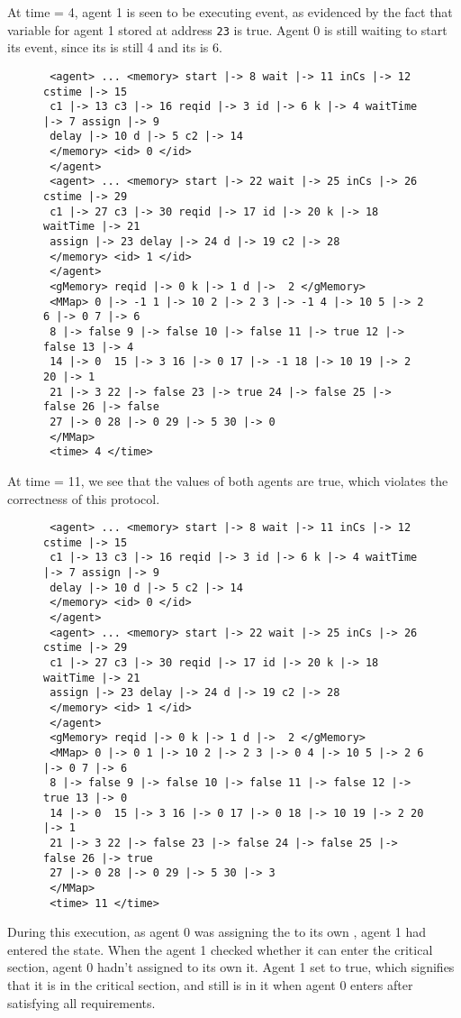 At time = 4, agent 1 is seen to be executing  event, as evidenced by the fact that variable  for agent 1 stored at address \verb|23| is true. Agent 0 is still waiting to start its  event, since its  is still 4 and its  is 6.  
 \begin{figure}[H]
\begin{verbatim}
 <agent> ... <memory> start |-> 8 wait |-> 11 inCs |-> 12 cstime |-> 15 
 c1 |-> 13 c3 |-> 16 reqid |-> 3 id |-> 6 k |-> 4 waitTime |-> 7 assign |-> 9
 delay |-> 10 d |-> 5 c2 |-> 14 
 </memory> <id> 0 </id> 
 </agent> 
 <agent> ... <memory> start |-> 22 wait |-> 25 inCs |-> 26 cstime |-> 29
 c1 |-> 27 c3 |-> 30 reqid |-> 17 id |-> 20 k |-> 18 waitTime |-> 21 
 assign |-> 23 delay |-> 24 d |-> 19 c2 |-> 28 
 </memory> <id> 1 </id> 
 </agent>
 <gMemory> reqid |-> 0 k |-> 1 d |->  2 </gMemory>
 <MMap> 0 |-> -1 1 |-> 10 2 |-> 2 3 |-> -1 4 |-> 10 5 |-> 2 6 |-> 0 7 |-> 6
 8 |-> false 9 |-> false 10 |-> false 11 |-> true 12 |-> false 13 |-> 4
 14 |-> 0  15 |-> 3 16 |-> 0 17 |-> -1 18 |-> 10 19 |-> 2 20 |-> 1 
 21 |-> 3 22 |-> false 23 |-> true 24 |-> false 25 |-> false 26 |-> false
 27 |-> 0 28 |-> 0 29 |-> 5 30 |-> 0 
 </MMap>
 <time> 4 </time>
\end{verbatim}
\end{figure}
At time = 11, we see that the  values of both agents are true, which violates the correctness of this protocol. 
 \begin{figure}[H]
\begin{verbatim}
 <agent> ... <memory> start |-> 8 wait |-> 11 inCs |-> 12 cstime |-> 15 
 c1 |-> 13 c3 |-> 16 reqid |-> 3 id |-> 6 k |-> 4 waitTime |-> 7 assign |-> 9
 delay |-> 10 d |-> 5 c2 |-> 14 
 </memory> <id> 0 </id> 
 </agent> 
 <agent> ... <memory> start |-> 22 wait |-> 25 inCs |-> 26 cstime |-> 29
 c1 |-> 27 c3 |-> 30 reqid |-> 17 id |-> 20 k |-> 18 waitTime |-> 21 
 assign |-> 23 delay |-> 24 d |-> 19 c2 |-> 28 
 </memory> <id> 1 </id> 
 </agent>
 <gMemory> reqid |-> 0 k |-> 1 d |->  2 </gMemory>
 <MMap> 0 |-> 0 1 |-> 10 2 |-> 2 3 |-> 0 4 |-> 10 5 |-> 2 6 |-> 0 7 |-> 6
 8 |-> false 9 |-> false 10 |-> false 11 |-> false 12 |-> true 13 |-> 0
 14 |-> 0  15 |-> 3 16 |-> 0 17 |-> 0 18 |-> 10 19 |-> 2 20 |-> 1 
 21 |-> 3 22 |-> false 23 |-> false 24 |-> false 25 |-> false 26 |-> true
 27 |-> 0 28 |-> 0 29 |-> 5 30 |-> 3 
 </MMap>
 <time> 11 </time>
\end{verbatim}
\end{figure}
During this execution, as agent 0 was assigning the  to its own , agent 1 had entered the  state. 
When the agent 1 checked whether it can enter the critical section, agent 0 hadn't assigned  to its own it. Agent 1 set  to true, which signifies that it is in the critical section, and still is in it when agent 0 enters after satisfying all requirements. 


